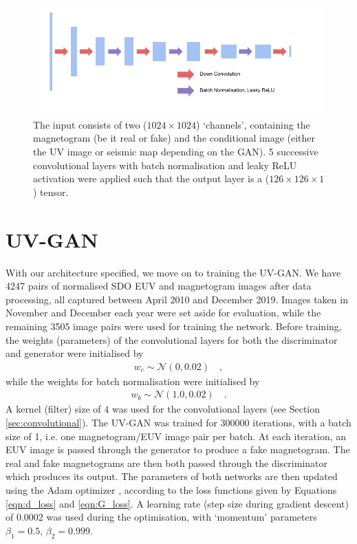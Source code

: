 \documentclass[11pt,a4paper,onecolumn]{report}
\begin{document}
\begin{figure}
  \centering
  \includegraphics[width=\linewidth]{Descrim.pdf}
  \caption{
    The input consists of two ($1024\times 1024$) `channels', containing the
    magnetogram (be it real or fake) and the conditional image (either the UV
    image or seismic map depending on the GAN). 5 successive convolutional
    layers with batch normalisation and leaky ReLU activation were applied such
    that the output layer is a ($126\times 126 \times 1$) tensor.
  }
  \label{fig:discrim_model}
\end{figure}



\section{UV-GAN}
With our architecture specified, we move on to training the UV-GAN. We have 4247
pairs of normalised SDO EUV and magnetogram images after data processing, all
captured between April 2010 and December 2019. Images taken in November and
December each year were set aside for evaluation, while the remaining 3505 image
pairs were used for training the network. Before training, the weights
(parameters) of the convolutional layers for both the discriminator and
generator were initialised by
\begin{align}
  w_c \sim \mathcal{N}\left(0, 0.02\right) \quad ,
\end{align}
while the weights for batch normalisation were initialised by
\begin{align}
  w_b \sim \mathcal{N}\left(1.0, 0.02\right) \quad .
\end{align}
A kernel (filter) size of $4$ was used for the convolutional layers (see Section
\ref{sec:convolutional}). The UV-GAN was trained for $300000$ iterations, with a
batch size of 1, i.e. one magnetogram/EUV image pair per batch. At each
iteration, an EUV image is passed through the generator to produce a fake
magnetogram. The real and fake magnetograms are then both passed through the
discriminator which produces its output. The parameters of both networks are
then updated using the Adam optimizer \citep{kingma_adam_2014}, according to the
loss functions given by Equations \ref{eqn:d_loss} and \ref{eqn:G_loss}. A
learning rate (step size during gradient descent) of $0.0002$ was used during
the optimisation, with `momentum' parameters $\beta_1 = 0.5$, $\beta_2 = 0.999$.\\
\end{document}
